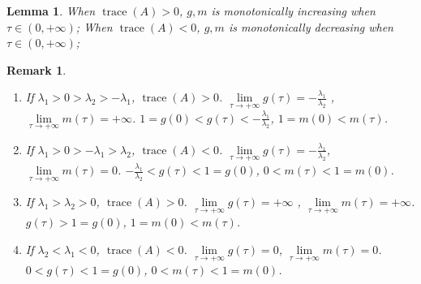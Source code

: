 \documentclass{article}
\newtheorem{lemma}[theorem]{Lemma}
\newtheorem{remark}{Remark}[theorem]
\begin{document}
\begin{lemma}
	When $\operatorname{trace}(A)>0$, $g,m$ is monotonically increasing when $\tau \in (0, + \infty)$; When $\operatorname{trace}(A)< 0$, $g,m$ is monotonically decreasing when $\tau \in (0, + \infty)$; 
\end{lemma}
\begin{remark}
	\begin{enumerate}
		\item If $\lambda_1 > 0 > \lambda_2 > - \lambda_1$, $\operatorname{trace}(A)>0$. $\lim\limits_{\tau \to + \infty} g(\tau) = -\frac{\lambda_1}{\lambda_2}$ , $\lim\limits_{\tau \to + \infty} m(\tau) =  + \infty$.
		  $1 = g(0) < g(\tau) < -\frac{\lambda_1}{\lambda_2}$, $1 = m(0) < m(\tau) $.
		
		\item If $\lambda_1 > 0 > - \lambda_1> \lambda_2 $, $\operatorname{trace}(A)<0$. 
		$\lim\limits_{\tau \to + \infty} g(\tau) = -\frac{\lambda_1}{\lambda_2}$, $\lim\limits_{\tau \to + \infty} m(\tau) = 0$. $-\frac{\lambda_1}{\lambda_2} < g(\tau) <1 = g(0)$, $0 < m(\tau) <1 = m(0) $.
		
		\item If $\lambda_1 >  \lambda_2 > 0$, $\operatorname{trace}(A)>0$.  $\lim\limits_{\tau \to + \infty} g(\tau) = + \infty$ , $\lim\limits_{\tau \to + \infty} m(\tau) =  + \infty$.
		$ g(\tau) > 1 = g(0)$, $1 = m(0) < m(\tau) $.
		
		\item If $ \lambda_2 < \lambda_1 < 0$, $\operatorname{trace}(A)<0$. 
		$\lim\limits_{\tau \to + \infty} g(\tau) = 0$, $\lim\limits_{\tau \to + \infty} m(\tau) = 0$. $0 < g(\tau) <1 = g(0)$, $0 < m(\tau) <1 = m(0) $.
	\end{enumerate}
\end{remark}

\appendix
\renewcommand{\theequation}{\Alph{section}.\arabic{equation}}
\renewcommand{\thesubsection}{\Alph{section}.\arabic{subsection}}
\renewcommand{\thesubsubsection}{\Alph{section}.\arabic{subsection}.\arabic{subsubsection}}
\renewcommand{\thefigure}{\Alph{section}.\arabic{figure}}
\renewcommand{\thetable}{\Alph{section}.\arabic{table}}
\clearpage

\clearpage


\end{document}

